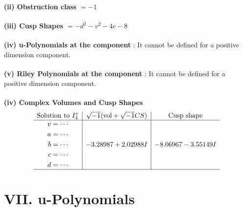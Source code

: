 \documentclass[1p]{elsarticle_modified}
\theoremstyle{definition}
\newcommand{\I}{\sqrt{-1}}
\begin{document}
\flushleft \textbf{(ii) Obstruction class $= -1$}\\~\\
\flushleft \textbf{(iii) Cusp Shapes $= - d^2- v^2-4 c-8$}\\~\\
\flushleft \textbf{(iv) u-Polynomials at the component} : It cannot be defined for a positive dimension component.\\~\\
\flushleft \textbf{(v) Riley Polynomials at the component} : It cannot be defined for a positive dimension component.\\~\\
\newpage\flushleft \textbf{(iv) Complex Volumes and Cusp Shapes}
$$\begin{array}{c|c|c} 
\text{Solution to }I^v_{4}& \I (\text{vol} + \sqrt{-1}CS) & \text{Cusp shape}\\
 \hline 
\begin{aligned}
v &= \cdots \\
a &= \cdots \\
b &= \cdots \\
c &= \cdots \\
d &= \cdots\end{aligned}
 & -3.28987 + 2.02988 I & -8.06967 - 3.55149 I\\
 \hline 
 \end{array}
$$
\newpage\renewcommand{\arraystretch}{1}
\centering \section*{ VII. u-Polynomials}
\end{document}
